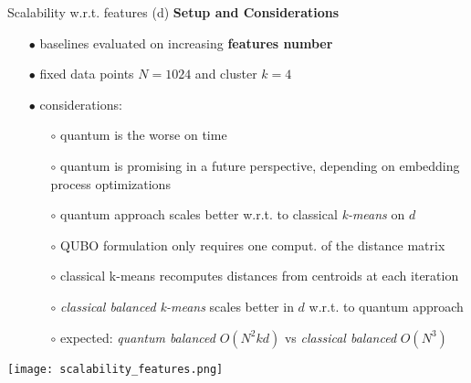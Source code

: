 		\begin{frame}[allowframebreaks]{Scalability w.r.t. features (d)}
			\small
			\textbf{Setup and Considerations}
			\begin{itemize}
				\item[$\bullet$] baselines evaluated on increasing \textbf{features number}
				\item[$\bullet$] fixed data points $N=1024$ and cluster $k=4$ 
				\item[$\bullet$] considerations:
				\begin{itemize}
					\item[$\circ$] quantum is the worse on time 
					\item[$\circ$] quantum is promising in a future perspective, depending on embedding process optimizations
					\item[$\circ$] quantum approach scales better w.r.t. to classical \textit{k-means} on $d$  

					\item[$\circ$] QUBO formulation only requires one comput. of the distance matrix 
					\item[$\circ$] classical k-means recomputes distances from centroids at each iteration 
					\item[$\circ$] \textit{classical balanced k-means} scales better in $d$ w.r.t. to quantum approach 
					\item[$\circ$] expected: \textit{quantum balanced} $O(N^2kd)$ vs \textit{classical balanced} $O(N^3)$  
				\end{itemize} 
			\end{itemize}
			\begin{center}
				\texttt{[image: scalability\_features.png]}
			\end{center}
		\end{frame}
	
